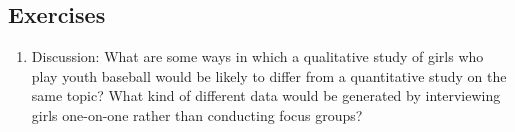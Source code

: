 \subsection{Exercises}

\begin{fullwidth}

\begin{enumerate}

\item  Discussion: What are some ways in which a qualitative study of girls who play youth baseball would be likely to differ from a quantitative study on the same topic? What kind of different data would be generated by interviewing girls one-on-one rather than conducting focus groups?

\end{enumerate}

\end{fullwidth}
